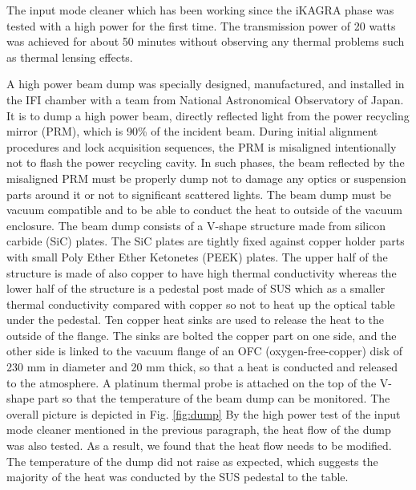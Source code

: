 The input mode cleaner which has been working since the iKAGRA phase
was tested with a high power for the first time.
The transmission power of 20 watts was achieved for about 50 minutes
without observing any thermal problems such as thermal lensing effects. 



A high power beam dump was specially designed, manufactured,
and installed in the IFI chamber with a team from National Astronomical Observatory of Japan.
It is to dump a high power beam, directly reflected light from the power recycling mirror (PRM), which is 90\% of the incident beam.
During initial alignment procedures and lock acquisition sequences,
the PRM is misaligned intentionally not to flash the power recycling cavity.
In such phases, the beam reflected by the misaligned PRM must be properly dump
not to damage any optics or suspension parts around it or not to significant scattered lights.
The beam dump must be vacuum compatible and to be able to
conduct the heat to outside of the vacuum enclosure.
The beam dump consists of a V-shape structure made from silicon carbide (SiC) plates.
The SiC plates are tightly fixed against copper holder parts with small Poly Ether Ether Ketonetes (PEEK) plates.
The upper half of the structure is made of also copper to have high thermal conductivity
whereas the lower half of the structure is a pedestal post made of SUS
which as a smaller thermal conductivity compared with copper
so not to heat up the optical table under the pedestal.
Ten copper heat sinks are used to release the heat to the outside of the flange.
The sinks are bolted the copper part on one side,
and the other side is linked to the vacuum flange of an OFC (oxygen-free-copper) disk
of 230 mm in diameter and 20 mm thick,
so that a heat is conducted and released to the atmosphere.
A platinum thermal probe is attached on the top of the V-shape part
so that the temperature of the beam dump can be monitored.
The overall picture is depicted in Fig. \ref{fig:dump}
By the high power test of the input mode cleaner mentioned in the previous paragraph,
the heat flow of the dump was also tested.
As a result, we found that the heat flow needs to be modified.
The temperature of the dump did not raise as expected,
which suggests the majority of the heat was conducted by the SUS pedestal to the table.
